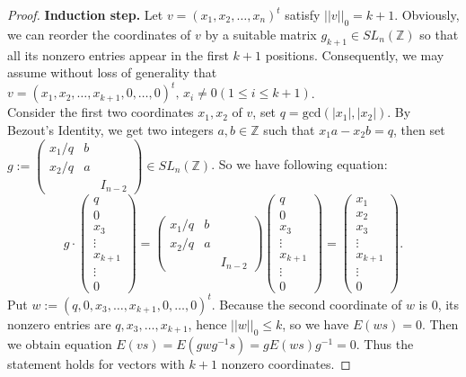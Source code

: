 \documentclass[12pt]{amsart}
\theoremstyle{definition}
\theoremstyle{remark}
\begin{document}
\begin{proof}
\textbf{Induction step.} Let $v = (x_1,x_2,\dots,x_n)^t$ satisfy $||v||_{0} = k+1$. Obviously, we can reorder the coordinates of $v$ by a suitable matrix $g_{k+1}\in SL_{n}(\mathbb{Z})$ so that all its nonzero entries appear in the first $k+1$ positions. Consequently, we may assume without loss of generality that $v=(x_1,x_2,\dots,x_{k+1},0,\dots,0)^t,\,x_i\ne0(1\le i \le k+1)$.\\
Consider the first two coordinates $x_1,x_2$ of $v$, set $q=\text{gcd}(|x_1|, |x_2|)$. By Bezout's Identity, we get two integers $a, b\in\mathbb{Z}$ such that $x_1a-x_2b=q$, then set $g:= 
   \left(\begin{smallmatrix}
     x_1/q & b \\
     x_2/q & a \\
     & & I_{n-2}
   \end{smallmatrix}\right)
   \in SL_{n}(\mathbb{Z})$.
So we have following equation:
\begin{equation*}
    g\cdot \left(\begin{smallmatrix}
        q\\
        0\\
        x_3\\
        \vdots\\
        x_{k+1}\\
        \vdots\\
        0
\end{smallmatrix}\right)=\left(\begin{smallmatrix}
     x_1/q & b \\
     x_2/q & a \\
     & & I_{n-2}
   \end{smallmatrix}\right) \left(\begin{smallmatrix}
        q\\
        0\\
        x_3\\
        \vdots\\
        x_{k+1}\\
        \vdots\\
        0
\end{smallmatrix}\right)=\left(\begin{smallmatrix}
        x_1\\
        x_2\\
        x_3\\
        \vdots\\
        x_{k+1}\\
        \vdots\\
        0
    \end{smallmatrix}\right).
\end{equation*}
Put $w:=(q,0,x_3,\dots,x_{k+1},0,\dots,0)^t$. Because the second coordinate of $w$ is 0, its nonzero entries are $q, x_{3},\dots,x_{k+1}$, hence $||w||_{0}\le k$, so we have $E(ws) = 0$. Then we obtain equation $E(vs) = E(gwg^{-1}s) = gE(ws)g^{-1} = 0$. Thus the statement holds for vectors with $k+1$ nonzero coordinates.


\end{proof}
\end{document}
